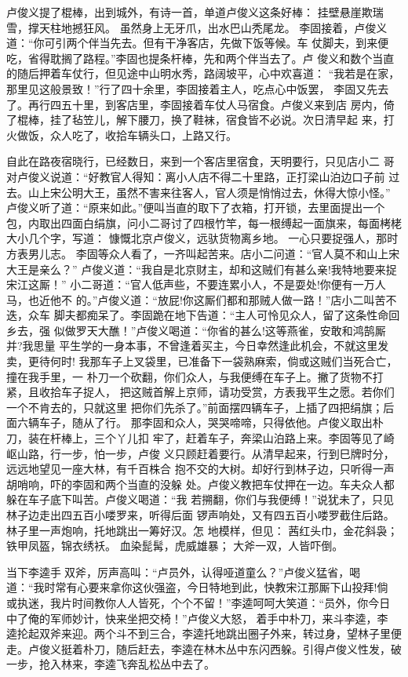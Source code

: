 卢俊义提了棍棒，出到城外，有诗一首，单道卢俊义这条好棒：
挂壁悬崖欺瑞雪，撑天柱地撼狂风。
虽然身上无牙爪，出水巴山秃尾龙。
李固接着，卢俊义道：“你可引两个伴当先去。但有干净客店，先做下饭等候。车
仗脚夫，到来便吃，省得耽搁了路程。”李固也提条杆棒，先和两个伴当去了。卢
俊义和数个当直的随后押着车仗行，但见途中山明水秀，路阔坡平，心中欢喜道：
“我若是在家，那里见这般景致！”行了四十余里，李固接着主人，吃点心中饭罢，
李固又先去了。再行四五十里，到客店里，李固接着车仗人马宿食。卢俊义来到店
房内，倚了棍棒，挂了毡笠儿，解下腰刀，换了鞋袜，宿食皆不必说。次日清早起
来，打火做饭，众人吃了，收拾车辆头口，上路又行。

自此在路夜宿晓行，已经数日，来到一个客店里宿食，天明要行，只见店小二
哥对卢俊义说道：“好教官人得知：离小人店不得二十里路，正打梁山泊边口子前
过去。山上宋公明大王，虽然不害来往客人，官人须是悄悄过去，休得大惊小怪。”
卢俊义听了道：“原来如此。”便叫当直的取下了衣箱，打开锁，去里面提出一个
包，内取出四面白绢旗，问小二哥讨了四根竹竿，每一根缚起一面旗来，每面栲栳
大小几个字，写道：
慷慨北京卢俊义，远驮货物离乡地。
一心只要捉强人，那时方表男儿志。
李固等众人看了，一齐叫起苦来。店小二问道：“官人莫不和山上宋大王是亲么？”
卢俊义道：“我自是北京财主，却和这贼们有甚么亲!我特地要来捉宋江这厮！”
小二哥道：“官人低声些，不要连累小人，不是耍处!你便有一万人马，也近他不
的。”卢俊义道：“放屁!你这厮们都和那贼人做一路！”店小二叫苦不迭，众车
脚夫都痴呆了。李固跪在地下告道：“主人可怜见众人，留了这条性命回乡去，强
似做罗天大醮！”卢俊义喝道：“你省的甚么!这等燕雀，安敢和鸿鹄厮并?我思量
平生学的一身本事，不曾逢着买主，今日幸然逢此机会，不就这里发卖，更待何时!
我那车子上叉袋里，已准备下一袋熟麻索，倘或这贼们当死合亡，撞在我手里，一
朴刀一个砍翻，你们众人，与我便缚在车子上。撇了货物不打紧，且收拾车子捉人，
把这贼首解上京师，请功受赏，方表我平生之愿。若你们一个不肯去的，只就这里
把你们先杀了。”前面摆四辆车子，上插了四把绢旗；后面六辆车子，随从了行。
那李固和众人，哭哭啼啼，只得依他。卢俊义取出朴刀，装在杆棒上，三个丫儿扣
牢了，赶着车子，奔梁山泊路上来。李固等见了崎岖山路，行一步，怕一步，卢俊
义只顾赶着要行。从清早起来，行到巳牌时分，远远地望见一座大林，有千百株合
抱不交的大树。却好行到林子边，只听得一声胡哨响，吓的李固和两个当直的没躲
处。卢俊义教把车仗押在一边。车夫众人都躲在车子底下叫苦。卢俊义喝道：“我
若搠翻，你们与我便缚！”说犹未了，只见林子边走出四五百小喽罗来，听得后面
锣声响处，又有四五百小喽罗截住后路。林子里一声炮响，托地跳出一筹好汉。怎
地模样，但见：
茜红头巾，金花斜袅；
铁甲凤盔，锦衣绣袄。
血染髭髯，虎威雄暴；
大斧一双，人皆吓倒。

当下李逵手双斧，厉声高叫：“卢员外，认得哑道童么？”卢俊义猛省，喝
道：“我时常有心要来拿你这伙强盗，今日特地到此，快教宋江那厮下山投拜!倘
或执迷，我片时间教你人人皆死，个个不留！”李逵呵呵大笑道：“员外，你今日
中了俺的军师妙计，快来坐把交椅！”卢俊义大怒，着手中朴刀，来斗李逵，李
逵抡起双斧来迎。两个斗不到三合，李逵托地跳出圈子外来，转过身，望林子里便
走。卢俊义挺着朴刀，随后赶去，李逵在林木丛中东闪西躲。引得卢俊义性发，破
一步，抢入林来，李逵飞奔乱松丛中去了。

